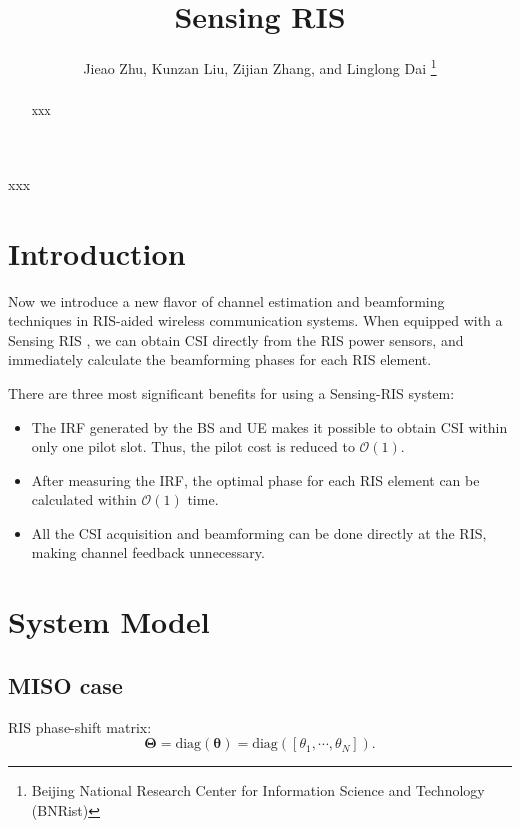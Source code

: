 \documentclass[12pt,draftclsnofoot,journal,onecolumn]{IEEEtran}
\theoremstyle{nonumberplain}
\def \diag {\text{diag}}
\begin{document}
\title{Sensing RIS}
\author{{Jieao Zhu, Kunzan Liu, Zijian Zhang, and Linglong Dai
\vspace*{-1em}}
\thanks{Beijing National Research Center for Information Science and Technology (BNRist)}
}

\maketitle

\begin{abstract}
xxx
\end{abstract}

\begin{IEEEkeywords}
xxx
\end{IEEEkeywords}
\section{Introduction}
    Now we introduce a new flavor of channel estimation and beamforming techniques in RIS-aided wireless communication systems. When equipped with a Sensing RIS \cite{ma2020smartsensing}, we can obtain CSI directly from the RIS power sensors, and immediately calculate the beamforming phases for each RIS element.

    There are three most significant benefits for using a Sensing-RIS system:
    \begin{itemize}
        \item The \ac{IRF} generated by the BS and UE makes it possible to obtain CSI within only one pilot slot. Thus, the pilot cost is reduced to $\mathcal{O}(1)$.
        \item After measuring the \ac{IRF}, the optimal phase for each RIS element can be calculated within $\mathcal{O}(1)$ time.
        \item All the CSI acquisition and beamforming can be done directly at the RIS, making channel feedback unnecessary.
    \end{itemize}

\section{System Model}
\label{System Model}
\subsection{MISO case}
\label{MISO case}

RIS phase-shift matrix:
\begin{equation}
\label{RIS}
\bm \Theta = \diag \left(\bm \theta\right )=\diag \left(\left[\theta_{1},\cdots ,\theta_{N}\right]\right).
\end{equation}
\end{document}
